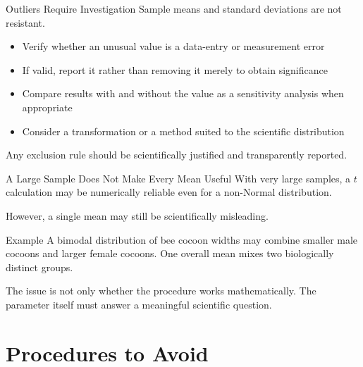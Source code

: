 \documentclass[aspectratio=169,10pt]{beamer}
\begin{document}
\begin{frame}{Outliers Require Investigation}
Sample means and standard deviations are not resistant.

\begin{itemize}
  \item Verify whether an unusual value is a data-entry or measurement error
  \item If valid, report it rather than removing it merely to obtain significance
  \item Compare results with and without the value as a sensitivity analysis when appropriate
  \item Consider a transformation or a method suited to the scientific distribution
\end{itemize}

Any exclusion rule should be scientifically justified and transparently reported.
\end{frame}

\begin{frame}{A Large Sample Does Not Make Every Mean Useful}
With very large samples, a $t$ calculation may be numerically reliable even for a non-Normal distribution.

\vspace{0.2cm}
However, a single mean may still be scientifically misleading.

\begin{block}{Example}
A bimodal distribution of bee cocoon widths may combine smaller male cocoons and larger female cocoons. One overall mean mixes two biologically distinct groups.
\end{block}

The issue is not only whether the procedure works mathematically. The parameter itself must answer a meaningful scientific question.
\end{frame}


\section{Procedures to Avoid}
\end{document}

